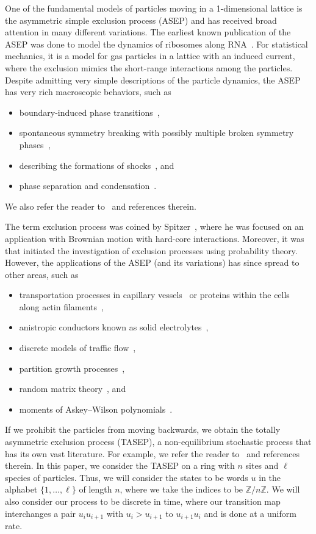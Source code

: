 \documentclass[reqno]{amsart}
\newcommand{\0}{\phantom{c}}
\newcommand{\ZZ}{\mathbb{Z}}
\theoremstyle{plain}
\theoremstyle{definition}
\numberwithin{equation}{section}
\begin{document}
One of the fundamental models of particles moving in a 1-dimensional lattice is the asymmetric simple exclusion process (ASEP) and has received broad attention in many different variations.
The earliest known publication of the ASEP was done to model the dynamics of ribosomes along RNA~\cite{MGP68}.
For statistical mechanics, it is a model for gas particles in a lattice with an induced current, where the exclusion mimics the short-range interactions among the particles.
Despite admitting very simple descriptions of the particle dynamics, the ASEP has very rich macroscopic behaviors, such as
\begin{itemize}
\item boundary-induced phase transitions~\cite{Krug91},
\item spontaneous symmetry breaking with possibly multiple broken symmetry phases~\cite{AHR98,AHR99,CEM01,EFGM95,EPSZ05,GLEMSS95,PK07},
\item describing the formations of shocks~\cite{DJLS93,Ferrari92,FF94,FF94II,Liggett76}, and
\item phase separation and condensation~\cite{EKKM98,JNHWW09,KLMST02,RSS00}.
\end{itemize}
We also refer the reader to~\cite{PEM09,Schutz01,SZ95,TJHJ16} and references therein.

The term exclusion process was coined by Spitzer~\cite{Spitzer70}, where he was focused on an application with Brownian motion with hard-core interactions.
Moreover, it was~\cite{Spitzer70} that initiated the investigation of exclusion processes using probability theory.
However, the applications of the ASEP (and its variations) has since spread to other areas, such as
\begin{itemize}
\item transportation processes in capillary vessels~\cite{Levitt73} or proteins within the cells along actin filaments~\cite{KNL05},
\item anistropic conductors known as solid electrolytes~\cite{CL99},
\item discrete models of traffic flow~\cite{Schad01},
\item partition growth processes~\cite{Lam15},
\item random matrix theory~\cite{Johansson00,TW09}, and
\item moments of Askey--Wilson polynomials~\cite{CW11}.
\end{itemize}

If we prohibit the particles from moving backwards, we obtain the totally asymmetric exclusion process (TASEP), a non-equilibrium stochastic process that has its own vast literature.
For example, we refer the reader to~\cite{AasLin17,AAMP,BE07,BP14,DEHP93,KMO15,KMO16,Liggett99} and references therein.
In this paper, we consider the TASEP on a ring with $n$ sites and $\ell$ species of particles.
Thus, we will consider the states to be words $u$ in the alphabet $\{1, \dotsc, \ell\}$ of length $n$, where we take the indices to be $\ZZ / n \ZZ$.
We will also consider our process to be discrete in time, where our transition map interchanges a pair $u_i u_{i+1}$ with $u_i > u_{i+1}$ to $u_{i+1} u_i$ and is done at a uniform rate.
\end{document}
